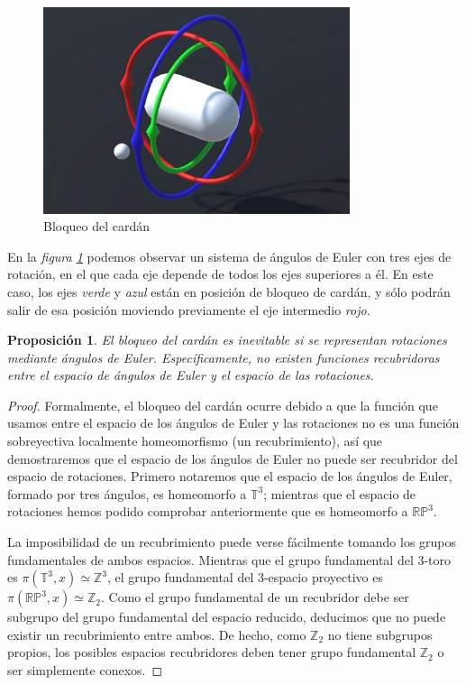 \documentclass{article}
\theoremstyle{plain}
\newtheorem{proposition}{Proposición}
\theoremstyle{definition}
\theoremstyle{remark}
\begin{document}
\begin{figure}[ht!]
\centering
\includegraphics[width=90mm]{cardan.jpg}
\caption{Bloqueo del cardán \label{figcardan}}
\end{figure}

En la \textit{figura \ref{figcardan}} podemos observar un sistema de ángulos
de Euler con tres ejes de rotación, en el que cada eje depende de
todos los ejes superiores a él. En este caso, los ejes \textit{verde} y \textit{azul}
están en posición de bloqueo de cardán, y sólo podrán salir de esa
posición moviendo previamente el eje intermedio \textit{rojo}.

\begin{proposition}
  El bloqueo del cardán es inevitable si se representan rotaciones
  mediante ángulos de Euler. Específicamente, no existen funciones
  recubridoras entre el espacio de ángulos de Euler y el espacio de
  las rotaciones.
\end{proposition}
\begin{proof}
  Formalmente, el bloqueo del cardán ocurre debido a que la función
  que usamos entre el espacio de los ángulos de Euler y las rotaciones
  no es una función sobreyectiva localmente homeomorfismo (un
  recubrimiento), así que demostraremos que el espacio de los ángulos
  de Euler no puede ser recubridor del espacio de rotaciones. Primero
  notaremos que el espacio de los ángulos de Euler, formado por tres
  ángulos, es homeomorfo a $\mathbb T^3$; mientras que el espacio de
  rotaciones hemos podido comprobar anteriormente que es homeomorfo a
  $\mathbb{RP}^3$.

  La imposibilidad de un recubrimiento puede verse fácilmente tomando
  los grupos fundamentales de ambos espacios. Mientras que el grupo
  fundamental del 3-toro es $\pi(\mathbb T^3, x) \simeq \mathbb Z^3$,
  el grupo fundamental del 3-espacio proyectivo es
  $\pi(\mathbb{RP}^3, x) \simeq \mathbb Z_2$. Como el grupo
  fundamental de un recubridor debe ser subgrupo del grupo fundamental
  del espacio reducido, deducimos que no puede existir un
  recubrimiento entre ambos. De hecho, como $\mathbb Z_2$ no tiene subgrupos
  propios, los posibles espacios recubridores deben tener grupo
  fundamental $\mathbb Z_2$ o ser simplemente conexos.
\end{proof}
\end{document}
